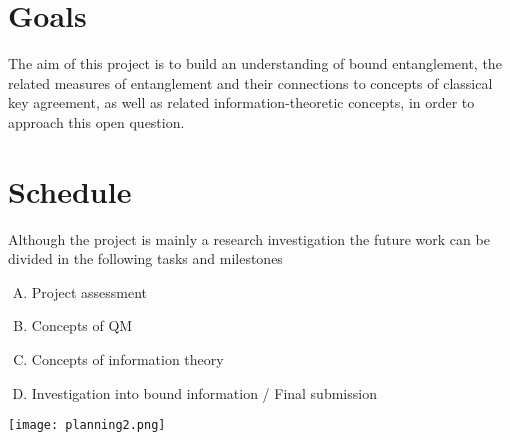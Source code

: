 \documentclass[titlepage]{article}
\begin{document}
\section*{Goals}
The aim of this project is to build an understanding of bound
entanglement, the related measures of entanglement and their connections
to concepts of classical key agreement, as well as related
information-theoretic concepts, in order to approach this open question.

\pagebreak

\section*{Schedule}

Although the project is mainly a research investigation the future work can be divided in the following tasks and milestones \\
\begin{enumerate}[A)]
\item Project assessment
\item Concepts of QM
\item Concepts of information theory
\item Investigation into bound information / Final submission
\end{enumerate}
\centerline{\texttt{[image: planning2.png]}}
\end{document}

